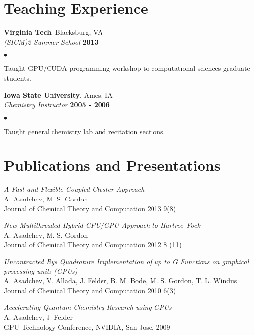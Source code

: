 \documentclass[overlap,line]{cv}
\newenvironment{list2}{
  \begin{list}{$\bullet$}{%
      \setlength{\itemsep}{0in}
      \setlength{\parsep}{0in} \setlength{\parskip}{0in}
      \setlength{\topsep}{0in} \setlength{\partopsep}{0in} 
      \setlength{\leftmargin}{0.2in}}}{\end{list}}
\begin{document}
\begin{resume}
\newpage

\section{\sc Teaching Experience}
\vspace{.05in}
{\bf Virginia Tech}, Blacksburg, VA \\
{\em (SICM)2 Summer School} \hfill {\bf 2013}

\begin{list2}
\item Taught GPU/CUDA programming workshop to computational sciences graduate students.
\end{list2}

{\bf Iowa State University}, Ames, IA \\
{\em Chemistry Instructor}  \hfill {\bf 2005 - 2006}

\begin{list2}
\item Taught general chemistry lab and recitation sections. 
\end{list2}


\section{\sc Publications and Presentations}
\vspace{.05in}

{\it A Fast and Flexible Coupled Cluster Approach} \\
A. Asadchev, M. S. Gordon \\
Journal of Chemical Theory and Computation 2013 9(8)

{\it New Multithreaded Hybrid CPU/GPU Approach to Hartree–Fock} \\
A. Asadchev, M. S. Gordon \\
Journal of Chemical Theory and Computation 2012 8 (11)

{\it Uncontracted Rys Quadrature Implementation of up to G Functions on graphical processing units (GPUs)} \\
A. Asadchev, V. Allada, J. Felder, B. M. Bode, M. S. Gordon, T. L. Windus \\
Journal of Chemical Theory and Computation 2010 6(3)

{\it Accelerating Quantum Chemistry Research using GPUs} \\
A. Asadchev, J. Felder \\
GPU Technology Conference, NVIDIA, San Jose, 2009


\end{resume}
\end{document}
